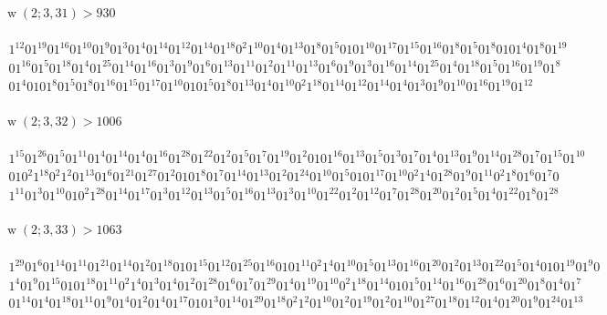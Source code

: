 \documentclass[final,3p,times]{elsarticle}
\theoremstyle{definition}
\DeclareMathOperator{\vdw}{w}
\begin{document}
\begin{appendix}
\paragraph{$\vdw(2; 3, 31) > 930$}

\begin{gather*}
  1^{12}01^{19}01^{16}01^{10}01^{9}01^{3}01^{4}01^{14}01^{12}01^{14}01^{18}0^{2}1^{10}01^{4}01^{13}01^{8}01^{5}0101^{10}01^{17}01^{15}01^{16}01^{8}01^{5}01^{8}0101^{4}01^{8}01^{19}\\
  01^{16}01^{5}01^{18}01^{4}01^{25}01^{14}01^{16}01^{3}01^{9}01^{6}01^{13}01^{11}01^{2}01^{11}01^{13}01^{6}01^{9}01^{3}01^{16}01^{14}01^{25}01^{4}01^{18}01^{5}01^{16}01^{19}01^{8}\\
  01^{4}0101^{8}01^{5}01^{8}01^{16}01^{15}01^{17}01^{10}0101^{5}01^{8}01^{13}01^{4}01^{10}0^{2}1^{18}01^{14}01^{12}01^{14}01^{4}01^{3}01^{9}01^{10}01^{16}01^{19}01^{12}
\end{gather*}


\paragraph{$\vdw(2; 3, 32) > 1006$}

\begin{gather*}
  1^{15}01^{26}01^{5}01^{11}01^{4}01^{14}01^{4}01^{16}01^{28}01^{22}01^{2}01^{5}01^{7}01^{19}01^{2}0101^{16}01^{13}01^{5}01^{3}01^{7}01^{4}01^{13}01^{9}01^{14}01^{28}01^{7}01^{15}01^{10}\\
  010^{2}1^{18}0^{2}1^{2}01^{13}01^{6}01^{21}01^{27}01^{2}0101^{8}01^{7}01^{14}01^{13}01^{2}01^{24}01^{10}01^{5}0101^{17}01^{10}0^{2}1^{4}01^{28}01^{9}01^{11}0^{2}1^{8}01^{6}01^{7}0\\
  1^{11}01^{3}01^{10}010^{2}1^{28}01^{14}01^{17}01^{3}01^{12}01^{13}01^{5}01^{16}01^{13}01^{3}01^{10}01^{22}01^{2}01^{12}01^{7}01^{28}01^{20}01^{2}01^{5}01^{4}01^{22}01^{8}01^{28}
\end{gather*}


\paragraph{$\vdw(2; 3, 33) > 1063$}

\begin{gather*}
  1^{29}01^{6}01^{14}01^{11}01^{21}01^{14}01^{2}01^{18}0101^{15}01^{12}01^{25}01^{16}0101^{11}0^{2}1^{4}01^{10}01^{5}01^{13}01^{16}01^{20}01^{2}01^{13}01^{22}01^{5}01^{4}0101^{19}01^{9}0\\
  1^{4}01^{9}01^{15}0101^{18}01^{11}0^{2}1^{4}01^{3}01^{4}01^{2}01^{28}01^{6}01^{7}01^{29}01^{4}01^{19}01^{10}0^{2}1^{18}01^{14}0101^{5}01^{14}01^{16}01^{28}01^{6}01^{20}01^{8}01^{4}01^{7}\\
  01^{14}01^{4}01^{18}01^{11}01^{9}01^{4}01^{2}01^{4}01^{17}0101^{3}01^{14}01^{29}01^{18}0^{2}1^{2}01^{10}01^{2}01^{19}01^{2}01^{10}01^{27}01^{18}01^{12}01^{4}01^{20}01^{9}01^{24}01^{13}
\end{gather*}



\end{appendix}
\end{document}
